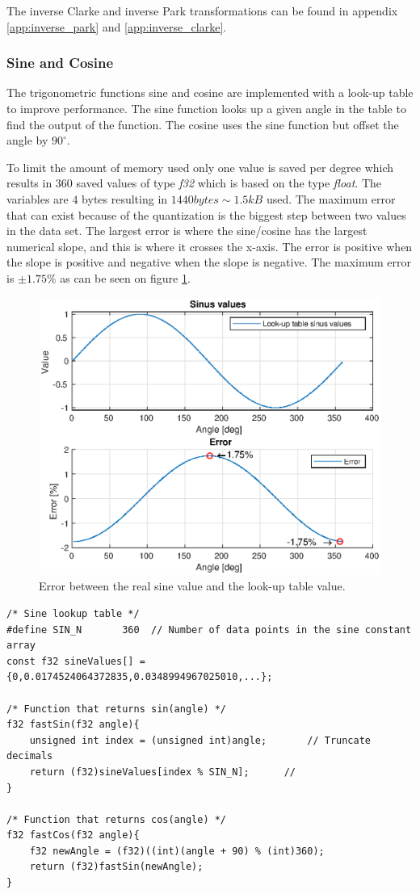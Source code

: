 The inverse Clarke and inverse Park transformations can be found in appendix \ref{app:inverse_park} and \ref{app:inverse_clarke}.


\subsubsection{Sine and Cosine}
\label{sec:sine_cosine}
The trigonometric functions sine and cosine are implemented with a look-up table to improve performance. The sine function looks up a given angle in the table to find the output of the function. The cosine uses the sine function but offset the angle by $90 ^{\circ}$. 

To limit the amount of memory used only one value is saved per degree which results in $360$ saved values of type \textit{f32} which is based on the type \textit{float}. The variables are $4$ bytes resulting in $1440 bytes \sim 1.5kB$ used.
The maximum error that can exist because of the quantization is the biggest step between two values in the data set. 
The largest error is where the sine/cosine has the largest numerical slope, and this is where it crosses the x-axis. The error is positive when the slope is positive and negative when the slope is negative. The maximum error is $\pm 1.75 \%$ as can be seen on figure \ref{fig:sinus_lookup_error}. 
\begin{figure}[H]
	\centering
	\includegraphics[width=0.6 \textwidth]{pictures/software/sinus_lookup_error.eps}
	\caption{Error between the real sine value and the look-up table value.}
	\label{fig:sinus_lookup_error}
\end{figure}



\begin{lstlisting}[style=c, caption=Sine and cosine implemented with look-up tables., label=code:lookup_table]
/* Sine lookup table */
#define SIN_N 		360	 // Number of data points in the sine constant array
const f32 sineValues[] = {0,0.0174524064372835,0.0348994967025010,...};

/* Function that returns sin(angle) */
f32 fastSin(f32 angle){
	unsigned int index = (unsigned int)angle;       // Truncate decimals
	return (f32)sineValues[index % SIN_N];      // 
}	

/* Function that returns cos(angle) */
f32 fastCos(f32 angle){
	f32 newAngle = (f32)((int)(angle + 90) % (int)360);
	return (f32)fastSin(newAngle);
}
\end{lstlisting}